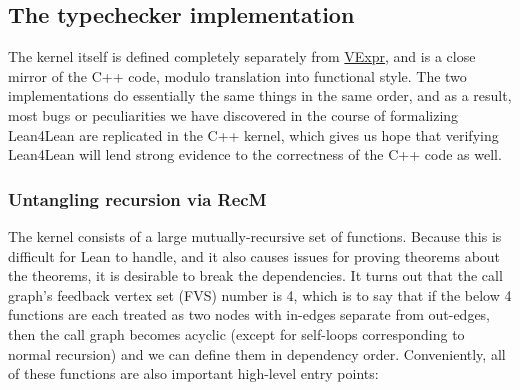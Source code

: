\documentclass[sigplan,10pt,screen]{acmart}\settopmatter{printfolios=true,printccs=false,printacmref=false}
\newcommand{\lfl}{\textsf{Lean4Lean}\xspace}
\newcommand{\code}[1]{\mbox{\ttfamily\small #1}}
\begin{document}
\subsection{The typechecker implementation}\label{sec:typeck-impl}
The kernel itself is defined completely separately from \href{https://github.com/digama0/lean4lean/blob/cpp2026/Lean4Lean/Theory/VExpr.lean#L6}{\code{VExpr}}, and is a close mirror of the C++ code, modulo translation into functional style. The two implementations do essentially the same things in the same order, and as a result, most bugs or peculiarities we have discovered in the course of formalizing \lfl are replicated in the C++ kernel, which gives us hope that verifying \lfl will lend strong evidence to the correctness of the C++ code as well.

\subsubsection{Untangling recursion via RecM}\label{sec:RecM}
The kernel consists of a large mutually-recursive set of functions. Because this is difficult for Lean to handle, and it also causes issues for proving theorems about the theorems, it is desirable to break the dependencies.
It turns out that the call graph's feedback vertex set (FVS) number is 4, which is to say that if the below 4 functions are each treated as two nodes with in-edges separate from out-edges, then the call graph becomes acyclic (except for self-loops corresponding to normal recursion) and we can define them in dependency order. Conveniently, all of these functions are also important high-level entry points:
\end{document}
